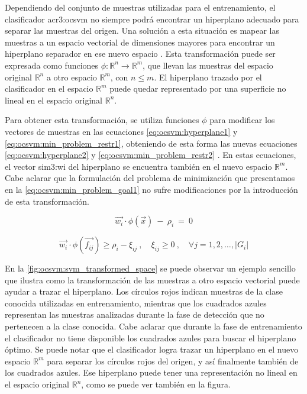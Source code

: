 Dependiendo del conjunto de muestras utilizadas para el entrenamiento,
el clasificador \gls{acr3:ocsvm} no siempre podrá encontrar un hiperplano
adecuado para separar las muestras del origen. Una solución a esta
situación es mapear las muestras a un espacio vectorial de dimensiones
mayores para encontrar un hiperplano separador en ese nuevo espacio
\citep{parhizkar2015oc}. %
Esta transformación puede ser expresada como funciones
$\phi: \mathbb{R}^{n} \rightarrow \mathbb{R}^{m}$, que llevan las muestras
del espacio original $\mathbb{R}^{n}$ a otro espacio $\mathbb{R}^{m}$,
con $n \leq m$. El hiperplano trazado por el clasificador en el espacio
$\mathbb{R}^{m}$ puede quedar representado por una superficie no lineal
en el espacio original $\mathbb{R}^{n}$.

Para obtener esta transformación, se utiliza funciones $\phi$ para modificar
los vectores de muestras en las ecuaciones \ref{eq:ocsvm:hyperplane1} y
\ref{eq:ocsvm:min_problem_restr1}, obteniendo de esta forma las nuevas
ecuaciones \ref{eq:ocsvm:hyperplane2} y \ref{eq:ocsvm:min_problem_restr2}
\citep{parhizkar2015oc} %
\citep{amer2013paper}. %
En estas ecuaciones, el vector \gls{sim3:wi} del hiperplano se encuentra
también en el nuevo espacio $\mathbb{R}^{m}$.
Cabe aclarar que la formulación del problema de minimización que presentamos
en la \autoref{eq:ocsvm:min_problem_goal1} no sufre modificaciones por la
introducción de esta transformación.

\begin{equation}
    \label{eq:ocsvm:hyperplane2}
    \vec{w_{i}} \cdot \phi(\vec{x})
    \ - \
    \rho_{i}
    \ = \
    0
\end{equation}

\begin{equation}
    \label{eq:ocsvm:min_problem_restr2}
    \vec{w_{i}} \cdot \phi(\vec{f_{ij}}) \geqslant \rho_{i} - \xi_{ij}
    \ , \quad
    \xi_{ij} \geqslant 0
    \ , \quad
    \forall j = 1,2, \dots, \lvert G_{i} \rvert
\end{equation}

En la \autoref{fig:ocsvm:svm_transformed_space} se puede observar un
ejemplo sencillo que ilustra como la transformación de las muestras a
otro espacio vectorial puede ayudar a trazar el hiperplano. Los círculos
rojos indican muestras de la clase conocida utilizadas en entrenamiento,
mientras que los cuadrados azules representan las muestras analizadas
durante la fase de detección que no pertenecen a la clase conocida.
Cabe aclarar que durante la fase de entrenamiento el clasificador no tiene
disponible los cuadrados azules para buscar el hiperplano óptimo.
Se puede notar que el clasificador logra trazar un hiperplano en el nuevo
espacio $\mathbb{R}^{m}$ para separar los círculos rojos del origen, y
así finalmente también de los cuadrados azules.
Ese hiperplano puede tener una representación no lineal en el espacio
original $\mathbb{R}^{n}$, como se puede ver también en la figura.

